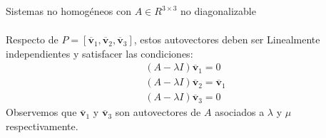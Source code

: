 \documentclass[a4paper, twoside]{article}
\numberwithin{equation}{section}
\numberwithin{figure}{section}
\numberwithin{table}{section}
\newcommand{\vect}[1]{\overline{\textbf{#1}}}
\begin{document}
\begin{corolario*}{Sistemas no homogéneos con $A \in R^{3 \times 3}$ no diagonalizable}
\begin{enumerate}
\begin{align}
		\end{align}
		Respecto de $P=[\vect{v}_1,\vect{v}_2,\vect{v}_3]$, estos autovectores deben ser Linealmente independientes y satisfacer las condiciones:
		\begin{align}
			\left( A-\lambda I \right)\vect{v}_1=0 \\
			\left( A-\lambda I \right)\vect{v}_2=\vect{v}_1 \\
			\left( A-\lambda I \right)\vect{v}_3=0
		\end{align}
		Observemos que $\vect{v}_1$ y $\vect{v}_3$ son autovectores de $A$ asociados a $\lambda$ y $\mu$ respectivamente.
	\end{enumerate}
\end{corolario*}


\makeseccioncolaboradores %

\makehistorial
\end{document}
